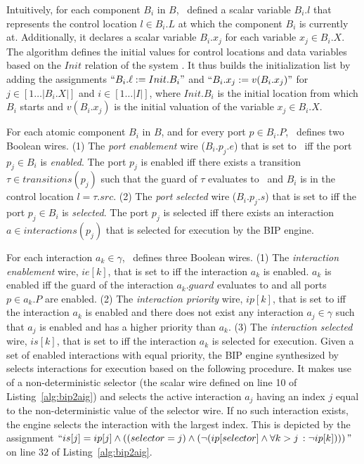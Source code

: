 Intuitively, for each component $B_i$ in $B$, \biptool~defined a scalar variable 
$B_i.l$ that represents the control location $l \in B_i.L$ at which the 
component $B_i$ is currently at. Additionally, it declares a scalar variable
$B_i.x_j$ for each variable $x_j \in B_i.X$. 
The algorithm defines the initial values for control locations and data variables 
based on the $Init$ relation of the system \Pm. It thus builds the initialization 
list by adding the assignments $``B_i.\ell := Init.B_i"$ and $``B_i.x_j := v(B_i.x_j)"$
for $j \in [1\ldots|B_i.X|]$ and $i \in [1\ldots|I|]$, where $Init.B_i$ is 
the initial location from which $B_i$ starts and $v(B_i.x_j)$ is the initial valuation of the
variable $x_j \in B_i.X$.


For each atomic component $B_i$ in $B$, and for every port $p \in B_i.P$, 
\biptool~defines two Boolean wires. 
(1) The {\em port enablement} wire ($B_i.p_j.e$) that is set to \true~iff the port $p_j \in B_i$ is 
{\em enabled}. The port $p_j$ is enabled iff there exists a transition $\tau \in transitions(p_j)$
such that the guard of $\tau$ evaluates to \true~and $B_i$ is in the control location $l = \tau.src$.
(2) The {\em port selected} wire ($B_i.p_j.s$) that is set to \true{} iff the port $p_j \in B_i$ is
{\em selected}. The port $p_j$ is selected iff there exists an interaction $a \in interactions(p_j)$
that is selected for execution by the BIP engine.

For each interaction $a_k \in \gamma$, \biptool~defines three Boolean wires. 
(1) The {\em interaction enablement} wire, $ie[k]$, that is set to \true{} iff the interaction
$a_k$ is enabled. $a_k$ is enabled iff the guard of the interaction $a_k.guard$ evaluates
to \true{} and all ports $p \in a_k.P$ are enabled.  
(2) The {\em interaction priority} wire, $ip[k]$, that is set to \true{} iff the interaction 
$a_k$ is enabled and there does not exist any interaction $a_j \in \gamma$ such that 
$a_j$ is enabled and has a higher priority than $a_k$.
(3) The {\em interaction selected} wire, $is[k]$, that is set to \true{} iff the
interaction $a_k$ is selected for execution. Given a set of enabled interactions 
with equal priority, the BIP engine synthesized by \biptool{}
selects interactions for execution based on the following procedure. It makes use of a
non-deterministic selector (the  scalar wire defined on line 10 
of Listing~\ref{alg:bip2aig}) and selects the active interaction $a_j$ having 
an index $j$ equal to the non-deterministic value of the selector wire.
If no such interaction exists, the engine selects the interaction with the largest 
index. 
This is depicted by the assignment $``is[j] = ip[j] \land \left( (selector = j) 
\land (\lnot (ip[selector] \land \forall{k > j}\,:\lnot ip[k])) \right)"$ on line 32 of Listing~\ref{alg:bip2aig}.

